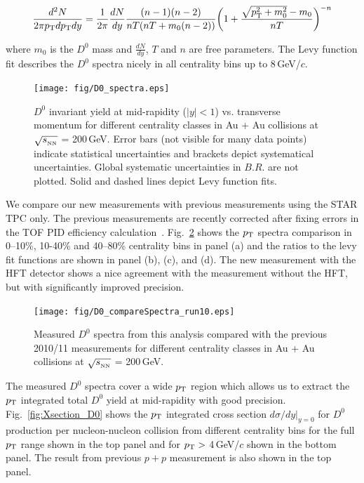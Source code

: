 \documentclass[%
 reprint,	
 amsmath,amssymb,
 aps,
 prc,
]{revtex4-1}
\providecommand{\DIFaddbeginFL}{} %
\providecommand{\DIFaddendFL}{} %
\providecommand{\DIFdelbeginFL}{} %
\providecommand{\DIFdelendFL}{} %
\begin{document}
\begin{widetext}
\[
\frac{d^2N}{2\pi p_{\rm T}dp_{\rm T}dy} = \frac{1}{2\pi}\frac{dN}{dy}\frac{(n-1)(n-2)}{nT(nT+m_0(n-2))}\bigg(1+\frac{\sqrt{p_{\rm T}^2+m_0^2}-m_0}{nT}\bigg)^{-n}
\]
\end{widetext}

where $m_0$ is the $D^0$ mass and $\frac{dN}{dy}$, $T$ and $n$ are free parameters. The Levy function fit describes the $D^0$ spectra nicely in all centrality bins up to 8\,GeV/$c$.


\begin{figure}
\centering
\DIFdelbeginFL %
\DIFdelendFL \DIFaddbeginFL \texttt{[image: fig/D0\_spectra.eps]}
\DIFaddendFL \caption{$D^{0}$ invariant yield at mid-rapidity ($|y|<1$) vs. transverse momentum for different centrality classes in Au + Au collisions at $\sqrt{s_{_{\rm NN}}}$ = 200\,GeV. Error bars (not visible for many data points) indicate statistical uncertainties and brackets depict systematical uncertainties. Global systematic uncertainties in $B.R.$ are not plotted. Solid and dashed lines depict Levy function fits.}
\label{fig:D0_spectra} 
\end{figure}


We compare our new measurements with previous measurements using the STAR TPC only. The previous measurements are recently corrected after fixing errors in the TOF PID efficiency calculation~\cite{Star_D_RAA,Star_D_RAA_corr}. Fig.~\ref{fig:D0_compareSpectra_run10} shows the $p_{\rm T}$ spectra comparison in 0--10\%, 10-40\% and 40--80\% centrality bins in panel (a) and the ratios to the levy fit functions are shown in panel (b), (c), and (d). The new measurement with the HFT detector shows a nice agreement with the measurement without the HFT, but with significantly improved precision.

\begin{figure}
\centering
\texttt{[image: fig/D0\_compareSpectra\_run10.eps]}
\caption{Measured $D^{0}$ spectra from this analysis compared with the previous 2010/11 measurements for different centrality classes in Au + Au collisions at $\sqrt{s_{_{\rm NN}}}$ = 200\,GeV.}
\label{fig:D0_compareSpectra_run10} 
\end{figure}


The measured $D^0$ spectra cover a wide $p_{\rm T}$ region which allows us to extract the $p_{\rm T}$ integrated total $D^0$ yield at mid-rapidity with good precision. Fig.~\ref{fig:Xsection_D0} shows the $p_{\rm T}$ integrated cross section $d\sigma/dy|_{y=0}$ for $D^0$ production per nucleon-nucleon collision from different centrality bins for the full $p_{\rm T}$ range shown in the top panel and for $p_{\rm T}>$ 4\,GeV/$c$ shown in the bottom panel. The result from previous $p+p$ measurement is also shown in the top panel.
\end{document}
